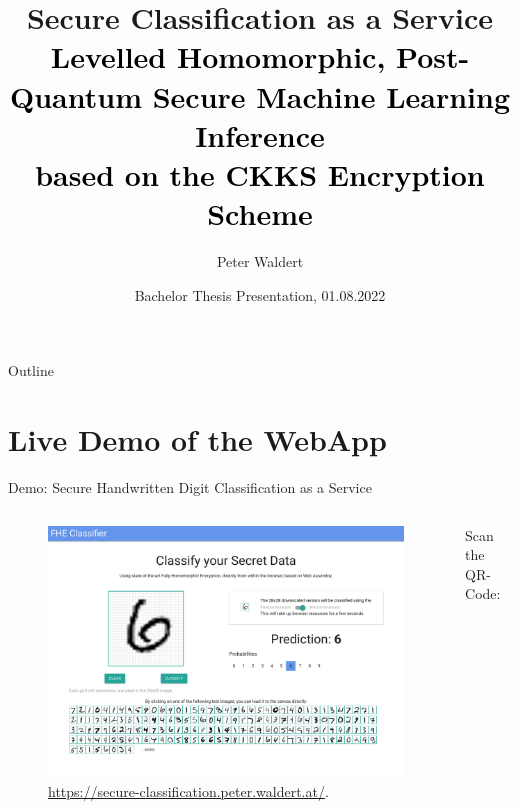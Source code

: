\documentclass[aspectratio=169, onlytextwidth]{beamer}
\title[Secure Classification as a Service]{
  Secure Classification as a Service \\
  \small\normalfont\textcolor{black}{
    Levelled Homomorphic, Post-Quantum Secure Machine Learning Inference \\
    based on the CKKS Encryption Scheme
  }
}
\author{Peter Waldert}
\date{Bachelor Thesis Presentation, 01.08.2022}
\institute{IAIK}
\begin{document}
  \begin{frame}[plain]
    \maketitle
  \end{frame}

  \begin{frame}{Outline}
    \tableofcontents
  \end{frame}

  
  
  
  

  \section{Live Demo of the WebApp}
  \begin{frame}{Demo: Secure Handwritten Digit Classification as a Service}
    \begin{columns}[c]
      \begin{column}{0.7\linewidth}
        \begin{figure}[H]
          \centering
          \includegraphics[width=0.75\linewidth]{../thesis/figures/frontend.pdf}
          \vspace{-0.3cm}
          \caption{\url{https://secure-classification.peter.waldert.at/}.}
        \end{figure}
      \end{column}
      \begin{column}{0.24\linewidth}
        Scan the QR-Code:
      \end{column}
    \end{columns}
  \end{frame}
\end{document}
